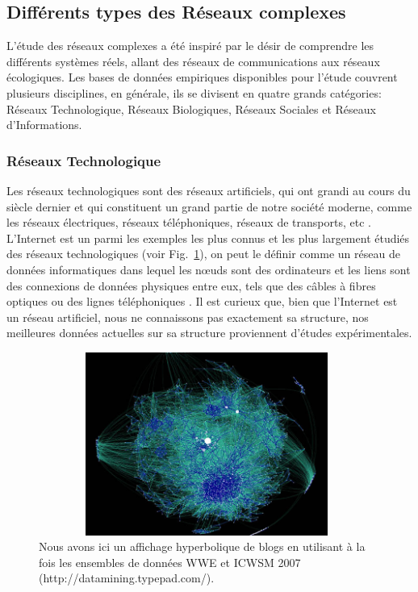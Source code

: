   \subsection{Différents types des Réseaux complexes}
  L'étude des réseaux complexes a été inspiré par le désir de comprendre les différents systèmes réels, allant des réseaux de communications aux réseaux écologiques. Les bases de données empiriques disponibles pour l'étude couvrent plusieurs disciplines, en générale, ils se divisent en quatre grands catégories: Réseaux Technologique, Réseaux Biologiques, Réseaux Sociales
  et Réseaux d'Informations.
  \subsubsection{Réseaux Technologique}
  Les réseaux technologiques sont des réseaux artificiels, qui ont grandi au cours du siècle dernier et qui constituent un grand partie de notre société moderne, comme les réseaux électriques, réseaux téléphoniques, réseaux de transports, etc \cite{Pi1965,Am-al2000,Do-al2007,Se-al2003}.
  L'Internet est un parmi les exemples les plus connus et les plus largement étudiés des réseaux technologiques (voir Fig.~\ref{Internet}), on peut le définir comme un réseau de données informatiques dans lequel les nœuds sont des ordinateurs et les liens sont des connexions de données physiques entre eux, tels que des câbles à fibres optiques ou des lignes téléphoniques \cite{F-al1999,BC2001}. Il est curieux que, bien que l'Internet est un réseau artificiel, nous ne connaissons pas exactement sa structure, nos meilleures données actuelles sur sa structure proviennent d'études expérimentales.
  \begin{figure}[h!]
  	\centering
  	\includegraphics[width=11cm,height=6cm]{./figures/Internet3}
  	\caption{Nous avons ici un affichage hyperbolique de blogs en utilisant à la fois les ensembles de données WWE et ICWSM 2007 (http://datamining.typepad.com/).}
  	\label{Internet}
  \end{figure}


